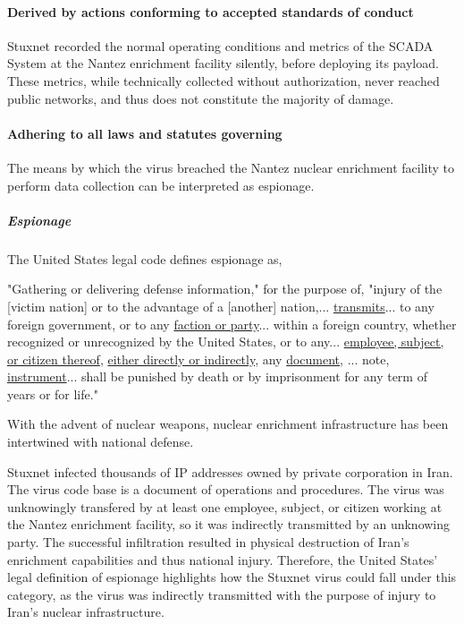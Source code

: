 \documentclass[12pt]{article}
\begin{document}
\begin{multicols}{2}
\paragraph{Derived by actions conforming to accepted standards of conduct}

Stuxnet recorded the normal operating conditions and metrics of the SCADA System at the Nantez enrichment facility silently, before deploying its payload. These metrics, while technically collected without authorization, never reached public networks, and thus does not constitute the majority of damage.

\paragraph{Adhering to all laws and statutes governing}

The means by which the virus breached the Nantez nuclear enrichment facility to perform data collection can be interpreted as espionage.

\subparagraph{Espionage}

The United States legal code defines espionage as,

\begin{displayquote}
"Gathering or delivering defense information," for the purpose of, "injury of the [victim nation] or to the advantage of a [another] nation,... \ul{transmits}... to any foreign government, or to any \ul{faction or party}... within a foreign country, whether recognized or unrecognized by the United States, or to any... \ul{employee, subject, or citizen thereof}, \ul{either directly or indirectly}, any \ul{document}, ... note, \ul{instrument}... shall be punished by death or by imprisonment for any term of years or for life."\cite{USEspionageLegalDefinition}
\end{displayquote}

With the advent of nuclear weapons, nuclear enrichment infrastructure has been intertwined with national defense.

Stuxnet infected thousands of IP addresses owned by private corporation in Iran. The virus code base is a document of operations and procedures. The virus was unknowingly transfered by at least one employee, subject, or citizen working at the Nantez enrichment facility, so it was indirectly transmitted by an unknowing party. The successful infiltration resulted in physical destruction of Iran's enrichment capabilities and thus national injury. Therefore, the United States' legal definition of espionage highlights how the Stuxnet virus could fall under this category, as the virus was indirectly transmitted with the purpose of injury to Iran's nuclear infrastructure.


\end{multicols}
\end{document}
